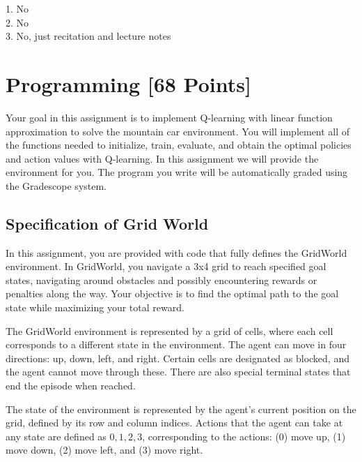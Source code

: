 \documentclass[11pt,addpoints,answers]{exam}
\begin{document}
\begin{questions}
\begin{your_solution}[height=6cm]
1. No
\\2. No
\\3. No, just recitation and lecture notes

\end{your_solution}
    \newpage
    \end{questions}
    
\section{Programming [68 Points]}
\label{sec:code}

Your goal in this assignment is to implement Q-learning with linear function approximation to solve the mountain car environment. You will implement all of the functions needed to initialize, train, evaluate, and obtain the optimal policies and action values with Q-learning. In this assignment we will provide the environment for you. The program you write will be automatically graded using the Gradescope system.


\subsection{Specification of Grid World}
In this assignment, you are provided with code that fully defines the GridWorld environment. In GridWorld, you navigate a 3x4 grid to reach specified goal states, navigating around obstacles and possibly encountering rewards or penalties along the way. Your objective is to find the optimal path to the goal state while maximizing your total reward.

The GridWorld environment is represented by a grid of cells, where each cell corresponds to a different state in the environment. The agent can move in four directions: up, down, left, and right. Certain cells are designated as blocked, and the agent cannot move through these. There are also special terminal states that end the episode when reached.

The state of the environment is represented by the agent's current position on the grid, defined by its row and column indices. Actions that the agent can take at any state are defined as ${0, 1, 2, 3}$, corresponding to the actions: (0) move up, (1) move down, (2) move left, and (3) move right.
\end{document}
